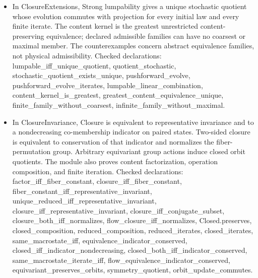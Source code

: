 \documentclass[11pt,a4paper]{article}
\newcommand{\lean}[1]{{\ttfamily\small
  \let\leanunderscore\_\def\_{\leanunderscore\allowbreak}#1}}
\begin{document}
\begin{itemize}[leftmargin=1.4em,itemsep=1pt]
{Checked declarations: \lean{run\_sequence\_append}, \lean{indist\_coarsest}, \lean{project\_eq\_iff}, \lean{project\_closed}, \lean{project\_content}, \lean{coarsest\_factorization}, \lean{factorization\_preserves}, \lean{project\_run}, \lean{reduced\_observable}, \lean{reach\_val\_run}, \lean{reach\_accessible}, \lean{reach\_observable}, \lean{reach\_initial\_output}, \lean{reachable\_quotient\_iso}.\par}
\item {\raggedright In \lean{ClosureExtensions}, Strong lumpability gives a unique stochastic quotient whose evolution commutes with projection for every initial law and every finite iterate. The content kernel is the greatest unrestricted content-preserving equivalence; declared admissible families can have no coarsest or maximal member. The counterexamples concern abstract equivalence families, not physical admissibility.
Checked declarations: \lean{lumpable\_iff\_unique\_quotient}, \lean{quotient\_stochastic}, \lean{stochastic\_quotient\_exists\_unique}, \lean{pushforward\_evolve}, \lean{pushforward\_evolve\_iterates}, \lean{lumpable\_linear\_combination}, \lean{content\_kernel\_is\_greatest}, \lean{greatest\_content\_equivalence\_unique}, \lean{finite\_family\_without\_coarsest}, \lean{infinite\_family\_without\_maximal}.\par}
\item {\raggedright In \lean{ClosureInvariance}, Closure is equivalent to representative invariance and to a nondecreasing co-membership indicator on paired states. Two-sided closure is equivalent to conservation of that indicator and normalizes the fiber-permutation group. Arbitrary equivariant group actions induce closed orbit quotients. The module also proves content factorization, operation composition, and finite iteration.
Checked declarations: \lean{factor\_iff\_fiber\_constant}, \lean{closure\_iff\_fiber\_constant}, \lean{fiber\_constant\_iff\_representative\_invariant}, \lean{unique\_reduced\_iff\_representative\_invariant}, \lean{closure\_iff\_representative\_invariant}, \lean{closure\_iff\_conjugate\_subset}, \lean{closure\_both\_iff\_normalizes}, \lean{flow\_closure\_iff\_normalizes}, \lean{Closed.preserves}, \lean{closed\_composition}, \lean{reduced\_composition}, \lean{reduced\_iterates}, \lean{closed\_iterates}, \lean{same\_macrostate\_iff}, \lean{equivalence\_indicator\_conserved}, \lean{closed\_iff\_indicator\_nondecreasing}, \lean{closed\_both\_iff\_indicator\_conserved}, \lean{same\_macrostate\_iterate\_iff}, \lean{flow\_equivalence\_indicator\_conserved}, \lean{equivariant\_preserves\_orbits}, \lean{symmetry\_quotient}, \lean{orbit\_update\_commutes}.\par}

\end{itemize}
\end{document}
